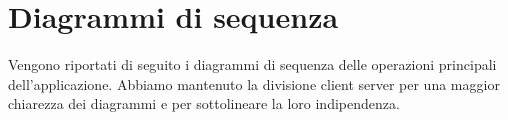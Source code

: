 %


\section{Diagrammi di sequenza} %
\label{sec:diagrammi_di_sequenza}

Vengono riportati di seguito i diagrammi di sequenza delle operazioni principali dell'applicazione. Abbiamo mantenuto la divisione client server per una maggior chiarezza dei diagrammi e per sottolineare la loro indipendenza.

\newpage \clearpage

 \newpage \clearpage

